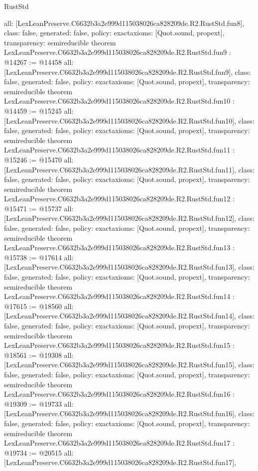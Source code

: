 \begin{lexlean}{RustStd}
\begin{coremodule}
{  all: [LexLeanPreserve.C6632b3a2e999d115038026ca828209de.R2.RustStd.fun8],
  class: false,
  generated: false,
  policy: exact{axioms: [Quot.sound, propext]},
  transparency: semireducible
}
theorem LexLeanPreserve.C6632b3a2e999d115038026ca828209de.R2.RustStd.fun9 : @14267 := @14458 {
  all: [LexLeanPreserve.C6632b3a2e999d115038026ca828209de.R2.RustStd.fun9],
  class: false,
  generated: false,
  policy: exact{axioms: [Quot.sound, propext]},
  transparency: semireducible
}
theorem LexLeanPreserve.C6632b3a2e999d115038026ca828209de.R2.RustStd.fun10 : @14459 := @15245 {
  all: [LexLeanPreserve.C6632b3a2e999d115038026ca828209de.R2.RustStd.fun10],
  class: false,
  generated: false,
  policy: exact{axioms: [Quot.sound, propext]},
  transparency: semireducible
}
theorem LexLeanPreserve.C6632b3a2e999d115038026ca828209de.R2.RustStd.fun11 : @15246 := @15470 {
  all: [LexLeanPreserve.C6632b3a2e999d115038026ca828209de.R2.RustStd.fun11],
  class: false,
  generated: false,
  policy: exact{axioms: [Quot.sound, propext]},
  transparency: semireducible
}
theorem LexLeanPreserve.C6632b3a2e999d115038026ca828209de.R2.RustStd.fun12 : @15471 := @15737 {
  all: [LexLeanPreserve.C6632b3a2e999d115038026ca828209de.R2.RustStd.fun12],
  class: false,
  generated: false,
  policy: exact{axioms: [Quot.sound, propext]},
  transparency: semireducible
}
theorem LexLeanPreserve.C6632b3a2e999d115038026ca828209de.R2.RustStd.fun13 : @15738 := @17614 {
  all: [LexLeanPreserve.C6632b3a2e999d115038026ca828209de.R2.RustStd.fun13],
  class: false,
  generated: false,
  policy: exact{axioms: [Quot.sound, propext]},
  transparency: semireducible
}
theorem LexLeanPreserve.C6632b3a2e999d115038026ca828209de.R2.RustStd.fun14 : @17615 := @18560 {
  all: [LexLeanPreserve.C6632b3a2e999d115038026ca828209de.R2.RustStd.fun14],
  class: false,
  generated: false,
  policy: exact{axioms: [Quot.sound, propext]},
  transparency: semireducible
}
theorem LexLeanPreserve.C6632b3a2e999d115038026ca828209de.R2.RustStd.fun15 : @18561 := @19308 {
  all: [LexLeanPreserve.C6632b3a2e999d115038026ca828209de.R2.RustStd.fun15],
  class: false,
  generated: false,
  policy: exact{axioms: [Quot.sound, propext]},
  transparency: semireducible
}
theorem LexLeanPreserve.C6632b3a2e999d115038026ca828209de.R2.RustStd.fun16 : @19309 := @19733 {
  all: [LexLeanPreserve.C6632b3a2e999d115038026ca828209de.R2.RustStd.fun16],
  class: false,
  generated: false,
  policy: exact{axioms: [Quot.sound, propext]},
  transparency: semireducible
}
theorem LexLeanPreserve.C6632b3a2e999d115038026ca828209de.R2.RustStd.fun17 : @19734 := @20515 {
  all: [LexLeanPreserve.C6632b3a2e999d115038026ca828209de.R2.RustStd.fun17],
}
\end{coremodule}
\end{lexlean}
